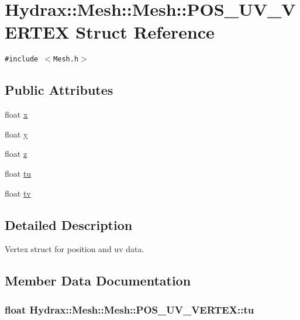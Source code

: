 \hypertarget{struct_hydrax_1_1_mesh_1_1_p_o_s___u_v___v_e_r_t_e_x}{
\section{Hydrax::Mesh::Mesh::POS\_\-UV\_\-VERTEX Struct Reference}
\label{struct_hydrax_1_1_mesh_1_1_p_o_s___u_v___v_e_r_t_e_x}
}
{\tt \#include $<$Mesh.h$>$}

\subsection*{Public Attributes}
\begin{CompactItemize}
\item 
float \hyperlink{struct_hydrax_1_1_mesh_1_1_p_o_s___u_v___v_e_r_t_e_x_1bbf31bd696a79c1f51026fd5b31cbd2}{x}
\item 
float \hyperlink{struct_hydrax_1_1_mesh_1_1_p_o_s___u_v___v_e_r_t_e_x_17aa16e34810db40b6b67e9aa52673d7}{y}
\item 
float \hyperlink{struct_hydrax_1_1_mesh_1_1_p_o_s___u_v___v_e_r_t_e_x_1cd321776804143d5d41a6efd7e708c2}{z}
\item 
float \hyperlink{struct_hydrax_1_1_mesh_1_1_p_o_s___u_v___v_e_r_t_e_x_0ee7eb730c1a0caffb7bd52386404a71}{tu}
\item 
float \hyperlink{struct_hydrax_1_1_mesh_1_1_p_o_s___u_v___v_e_r_t_e_x_147a6e06dcf03330d3ff6803aba5c7d7}{tv}
\end{CompactItemize}


\subsection{Detailed Description}
Vertex struct for position and uv data. 

\subsection{Member Data Documentation}
\hypertarget{struct_hydrax_1_1_mesh_1_1_p_o_s___u_v___v_e_r_t_e_x_0ee7eb730c1a0caffb7bd52386404a71}{
\subsubsection[{tu}]{\setlength{\rightskip}{0pt plus 5cm}float Hydrax::Mesh::Mesh::POS\_\-UV\_\-VERTEX::tu}}
\label{struct_hydrax_1_1_mesh_1_1_p_o_s___u_v___v_e_r_t_e_x_0ee7eb730c1a0caffb7bd52386404a71}


